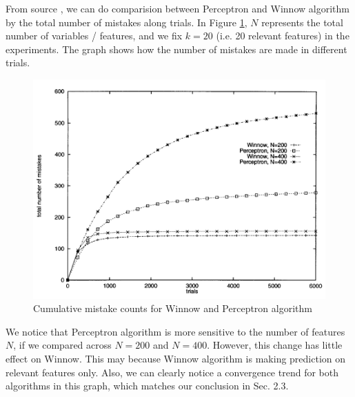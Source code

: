 \documentclass[11pt]{article}
\begin{document}
From source \cite{jkivinen_1997}, we can do comparision between Perceptron and Winnow algorithm by the total number of mistakes along trials. In Figure \ref{fig:comp}, $N$ represents the total number of variables / features, and we fix $k = 20$ (i.e. 20 relevant features) in the experiments. The graph shows how the number of mistakes are made in different trials. 

\begin{figure}[h]
\centering
\includegraphics[width=1.0\textwidth]{compare.png}
\caption{Cumulative mistake counts for Winnow and Perceptron algorithm}
\label{fig:comp}
\end{figure}

We notice that Perceptron algorithm is more sensitive to the number of features $N$, if we compared across $N=200$ and $N=400$. However, this change has little effect on Winnow. This may because Winnow algorithm is making prediction on relevant features only. Also, we can clearly notice a convergence trend for both algorithms in this graph, which matches our conclusion in Sec. 2.3.


{


}


\end{document}
